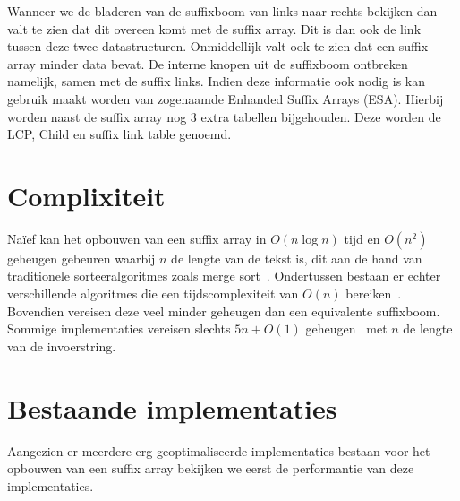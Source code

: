 Wanneer we de bladeren van de suffixboom van links naar rechts bekijken dan valt te zien dat dit overeen komt met de suffix array.
Dit is dan ook de link tussen deze twee datastructuren.
Onmiddellijk valt ook te zien dat een suffix array minder data bevat.
De interne knopen uit de suffixboom ontbreken namelijk, samen met de suffix links.
Indien deze informatie ook nodig is kan gebruik maakt worden van zogenaamde Enhanded Suffix Arrays (ESA).
Hierbij worden naast de suffix array nog 3 extra tabellen bijgehouden.
Deze worden de LCP, Child en suffix link table genoemd.


\section{Complixiteit}\label{sec:complixiteit}
Naïef kan het opbouwen van een suffix array in $O(n \log n)$ tijd en $O(n^2)$ geheugen gebeuren waarbij $n$ de lengte van de tekst is, dit aan de hand van traditionele sorteeralgoritmes zoals merge sort~\cite{mergeSort}.
Ondertussen bestaan er echter verschillende algoritmes die een tijdscomplexiteit van $O(n)$ bereiken~\cite{sais, ko_alura, radixSA, dark_archon, libdivsufsort}.
Bovendien vereisen deze veel minder geheugen dan een equivalente suffixboom.
Sommige implementaties vereisen slechts $5n + O(1)$ geheugen~\cite{dark_archon, libdivsufsort} met $n$ de lengte van de invoerstring.


\section{Bestaande implementaties}\label{sec:bestaande-implementaties}
Aangezien er meerdere erg geoptimaliseerde implementaties bestaan voor het opbouwen van een suffix array bekijken we eerst de performantie van deze implementaties.

